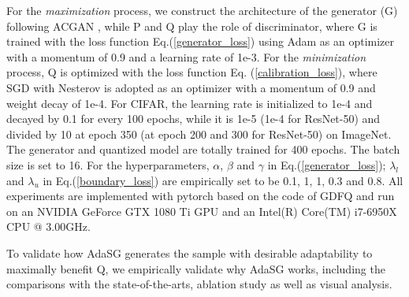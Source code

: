 For the \emph{maximization} process, we construct the architecture of the generator (G) following ACGAN \cite{odena2017conditional}, while P and Q play the role of discriminator, where G is trained with the loss function Eq.(\ref{generator_loss}) using Adam \cite{kingma2014adam} as an optimizer with a momentum of 0.9 and a learning rate of 1e-3.
For the \emph{minimization} process, Q is optimized with the loss function Eq. (\ref{calibration_loss}), where SGD with Nesterov \cite{nesterov1983method} is adopted as an optimizer with a momentum of 0.9 and weight decay of 1e-4. For CIFAR, the learning rate is initialized to 1e-4 and decayed by 0.1 for every 100 epochs, while it is 1e-5 (1e-4 for ResNet-50) and divided by 10 at epoch 350 (at epoch 200 and 300 for ResNet-50) on ImageNet. The generator and quantized model are totally trained for 400 epochs. The batch size is set to 16.
For the hyperparameters,  $\alpha$, $\beta$ and $\gamma$ in Eq.(\ref{generator_loss}); $\lambda_l$ and $\lambda_u$ in Eq.(\ref{boundary_loss}) are empirically set to be 0.1, 1, 1, 0.3 and 0.8. 
All experiments are implemented with pytorch \cite{paszke2019pytorch} based on the code of GDFQ \cite{xu2020generative} and run on an NVIDIA GeForce GTX 1080 Ti GPU and an Intel(R) Core(TM) i7-6950X CPU @ 3.00GHz.

To validate how AdaSG generates the sample with desirable adaptability to maximally benefit Q, we empirically validate why AdaSG works, including the comparisons with the  state-of-the-arts, ablation study as well as visual analysis.






